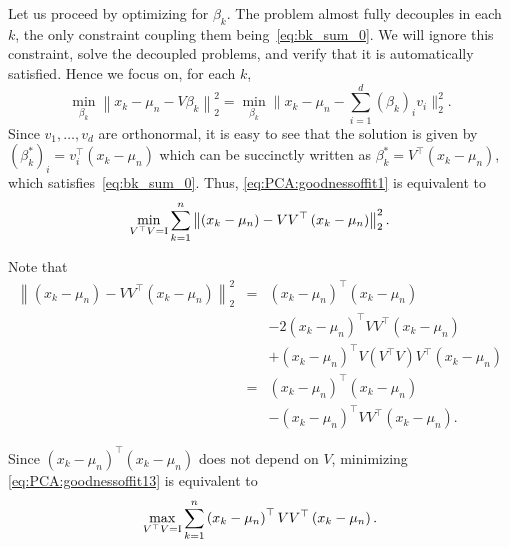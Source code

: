 Let us proceed by optimizing for $\beta_k$. The problem almost fully decouples in each $k$, the only constraint coupling them being~\eqref{eq:bk_sum_0}. We will ignore this constraint, solve the decoupled problems, and verify that it is automatically satisfied. Hence we focus on, for each $k$,
\begin{equation}\label{eq:PCA:goodnessoffit12}
 \min_{\beta_k} \left\| x_k - \mu_n - V\beta_k   \right\|_2^2 =
 \min_{\beta_k} \Big\| x_k - \mu_n - \sum_{i=1}^d \left(\beta_k \right)_i v_i   \Big\|_2^2.
\end{equation}
Since $v_1,\dots,v_d$ are orthonormal, it is easy to see that the solution is given by $\left(\beta_k^\ast \right)_i = v_i^\top  \left( x_k - \mu_n\right)$ which can be succinctly written as $\beta_k^* = V^\top  \left(x_k - \mu_n\right)$, which satisfies~\eqref{eq:bk_sum_0}. Thus, \eqref{eq:PCA:goodnessoffit1} is equivalent to
\begin{equation}\label{eq:PCA:goodnessoffit13}
 \min_{V^\top  V=\operatorname{I}} \sum_{k=1}^n \left\| \left( x_k - \mu_n \right) -  VV^\top  \left(x_k - \mu_n\right)   \right\|_2^2.
\end{equation}

Note that
\begin{eqnarray*}
 \left\| \left( x_k - \mu_n \right) -  VV^\top  \left(x_k - \mu_n\right)   \right\|_2^2 & = & \left( x_k - \mu_n \right)^\top  \left( x_k - \mu_n \right) \\ & &  - 2\left( x_k - \mu_n \right)^\top  VV^\top  \left(x_k - \mu_n\right) \\ & &  +\left(x_k - \mu_n\right)^\top  V\left(V^\top  V\right)V^\top  \left(x_k - \mu_n\right) \\
 & = & \left( x_k - \mu_n \right)^\top  \left( x_k - \mu_n \right) \\ & &  - \left( x_k - \mu_n \right)^\top  VV^\top  \left(x_k - \mu_n\right).
\end{eqnarray*}

Since $\left( x_k - \mu_n \right)^\top  \left( x_k - \mu_n \right)$ does not depend on $V$, minimizing \eqref{eq:PCA:goodnessoffit13} is equivalent to
\begin{equation}\label{eq:PCA:goodnessoffit13_max}
 \max_{V^\top  V=\operatorname{I}} \sum_{k=1}^n \left( x_k - \mu_n \right)^\top  VV^\top  \left(x_k - \mu_n\right).
\end{equation}

